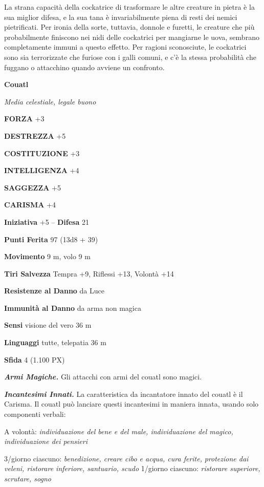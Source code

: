 \begin{multicols}{2}
	La strana capacità della cockatrice di trasformare le altre creature in pietra è la sua miglior difesa, e la sua tana è invariabilmente piena di resti dei nemici pietrificati. Per ironia della sorte, tuttavia, donnole e furetti, le creature che più probabilmente finiscono nei nidi delle cockatrici per mangiarne le uova, sembrano completamente immuni a questo effetto. Per ragioni sconosciute, le cockatrici sono sia terrorizzate che furiose con i galli comuni, e c'è la stessa probabilità che fuggano o attacchino quando avviene un confronto.


	\medskip{}\textbf{Couatl}

	\textit{Media celestiale, legale buono}

	\textbf{FORZA} +3

	\textbf{DESTREZZA} +5

	\textbf{COSTITUZIONE} +3

	\textbf{INTELLIGENZA} +4

	\textbf{SAGGEZZA} +5

	\textbf{CARISMA} +4

	\textbf{Iniziativa} +5 -- \textbf{Difesa} 21

	\textbf{Punti Ferita} 97 (13d8 + 39)

	\textbf{Movimento} 9 m, volo 9 m

	\textbf{Tiri Salvezza} Tempra +9, Riflessi +13, Volontà +14

	\textbf{Resistenze al Danno} da Luce

	\textbf{Immunità al Danno} da arma non magica

	\textbf{Sensi} visione del vero 36 m

	\textbf{Linguaggi} tutte, telepatia 36 m

	\textbf{Sfida} 4 (1.100 PX)

	\textit{\textbf{Armi Magiche.}} Gli attacchi con armi del couatl sono magici.

	\textit{\textbf{Incantesimi Innati.}} La caratteristica da incantatore innato del couatl è il Carisma. Il couatl può lanciare questi incantesimi in maniera innata, usando solo componenti verbali:

	A volontà: \textit{individuazione del bene e del male, individuazione del magico, individuazione dei pensieri}

	3/giorno ciascuno: \textit{benedizione, creare cibo e acqua, cura ferite,} \textit{protezione dai veleni, ristorare inferiore, santuario, scudo} 1/giorno ciascuno: \textit{ristorare superiore, scrutare, sogno}


\end{multicols}
